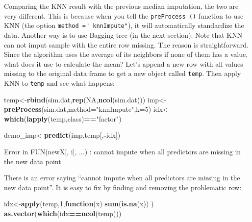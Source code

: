 \documentclass[
]{article}
\newenvironment{Shaded}{\begin{snugshade}}{\end{snugshade}}
\newcommand{\ControlFlowTok}[1]{\textcolor[rgb]{0.13,0.29,0.53}{\textbf{#1}}}
\newcommand{\DataTypeTok}[1]{\textcolor[rgb]{0.13,0.29,0.53}{#1}}
\newcommand{\DecValTok}[1]{\textcolor[rgb]{0.00,0.00,0.81}{#1}}
\newcommand{\KeywordTok}[1]{\textcolor[rgb]{0.13,0.29,0.53}{\textbf{#1}}}
\newcommand{\NormalTok}[1]{#1}
\newcommand{\OperatorTok}[1]{\textcolor[rgb]{0.81,0.36,0.00}{\textbf{#1}}}
\newcommand{\OtherTok}[1]{\textcolor[rgb]{0.56,0.35,0.01}{#1}}
\newcommand{\StringTok}[1]{\textcolor[rgb]{0.31,0.60,0.02}{#1}}
\begin{document}
Comparing the KNN result with the previous median imputation, the two
are very different. This is because when you tell the
\texttt{preProcess\ ()} function to use KNN (the option
\texttt{method\ ="\ knnImpute"}), it will automatically standardize the
data. Another way is to use Bagging tree (in the next section). Note
that KNN can not imput sample with the entire row missing. The reason is
straightforward. Since the algorithm uses the average of its neighbors
if none of them has a value, what does it use to calculate the mean?
Let's append a new row with all values missing to the original data
frame to get a new object called \texttt{temp}. Then apply KNN to
\texttt{temp} and see what happens:

\begin{Shaded}
\begin{Highlighting}[]
\NormalTok{temp<-}\KeywordTok{rbind}\NormalTok{(sim.dat,}\KeywordTok{rep}\NormalTok{(}\OtherTok{NA}\NormalTok{,}\KeywordTok{ncol}\NormalTok{(sim.dat)))}
\NormalTok{imp<-}\KeywordTok{preProcess}\NormalTok{(sim.dat,}\DataTypeTok{method=}\StringTok{"knnImpute"}\NormalTok{,}\DataTypeTok{k=}\DecValTok{5}\NormalTok{)}
\NormalTok{idx<-}\KeywordTok{which}\NormalTok{(}\KeywordTok{lapply}\NormalTok{(temp,class)}\OperatorTok{==}\StringTok{"factor"}\NormalTok{)}
\end{Highlighting}
\end{Shaded}

\begin{Shaded}
\begin{Highlighting}[]
\NormalTok{demo_imp<-}\KeywordTok{predict}\NormalTok{(imp,temp[,}\OperatorTok{-}\NormalTok{idx])}
\end{Highlighting}
\end{Shaded}

\begin{Shaded}
\begin{Highlighting}[]
\NormalTok{Error in FUN(newX[, i], ...) : }
\NormalTok{  cannot impute when all predictors are missing in the new data point}
\end{Highlighting}
\end{Shaded}

There is an error saying ``cannot impute when all predictors are missing
in the new data point''. It is easy to fix by finding and removing the
problematic row:

\begin{Shaded}
\begin{Highlighting}[]
\NormalTok{idx<-}\KeywordTok{apply}\NormalTok{(temp,}\DecValTok{1}\NormalTok{,}\ControlFlowTok{function}\NormalTok{(x) }\KeywordTok{sum}\NormalTok{(}\KeywordTok{is.na}\NormalTok{(x)) )}
\KeywordTok{as.vector}\NormalTok{(}\KeywordTok{which}\NormalTok{(idx}\OperatorTok{==}\KeywordTok{ncol}\NormalTok{(temp)))}
\end{Highlighting}
\end{Shaded}
\end{document}
